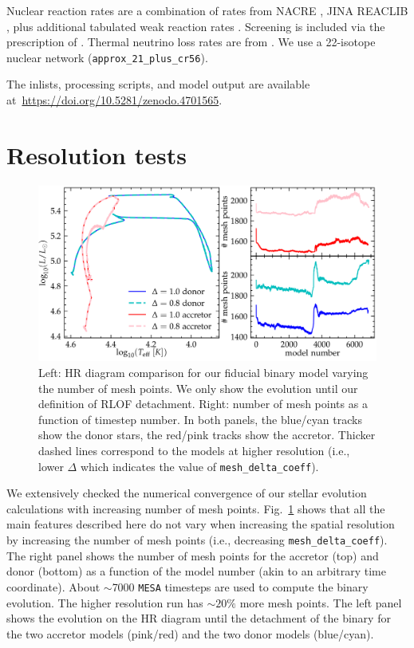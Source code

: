 \documentclass[twocolumn,twocolappendix,trackchanges]{aastex63}
\DeclareRobustCommand{\Figref}[1]{Fig.~\ref{#1}}
\begin{document}
Nuclear reaction rates are a combination of rates from NACRE
\citep{Angulo1999}, JINA REACLIB \citep{Cyburt2010}, plus additional
tabulated weak reaction rates \citet{Fuller1985, Oda1994,
  Langanke2000}. Screening is included via the prescription of
\citet{Chugunov2007}.  Thermal neutrino loss rates are from
\citet{Itoh1996}. We use a
22-isotope nuclear network (\texttt{approx\_21\_plus\_cr56}).

The inlists, processing scripts, and model output are available at~\url{https://doi.org/10.5281/zenodo.4701565}.

\section{Resolution tests}
\label{sec:res_tests}


\begin{figure}[htbp]
  \centering
  \includegraphics[width=\textwidth]{spatial_res_plot}
  \caption{Left: HR diagram comparison for our fiducial binary model varying
  the number of mesh points. We only show the evolution until our definition
  of RLOF detachment. Right: number of mesh points as a
  function of timestep number. In both panels, the blue/cyan tracks show the donor stars, the
red/pink tracks show the accretor. Thicker dashed lines correspond to
the models at higher resolution (i.e., lower $\Delta$ which indicates
the value of \texttt{mesh\_delta\_coeff}).}
\label{fig:sp_test}
\end{figure}

We extensively checked the numerical convergence of our stellar
evolution calculations with increasing number of mesh
points. \Figref{fig:sp_test} shows that all the main features described
here do not vary when increasing the spatial resolution by increasing
the number of mesh points (i.e.,
decreasing \texttt{mesh\_delta\_coeff}). The right panel shows the
number of mesh points for the accretor (top) and donor (bottom) as a
function of the model number (akin to an arbitrary time
coordinate). About $\sim$7000 \texttt{MESA} timesteps are used to compute
the binary evolution. The higher resolution run has $\sim 20\%$ more
mesh points. The left panel shows the evolution on the HR diagram until the
detachment of the binary for the two accretor models (pink/red) and
the two donor models (blue/cyan).
\end{document}
